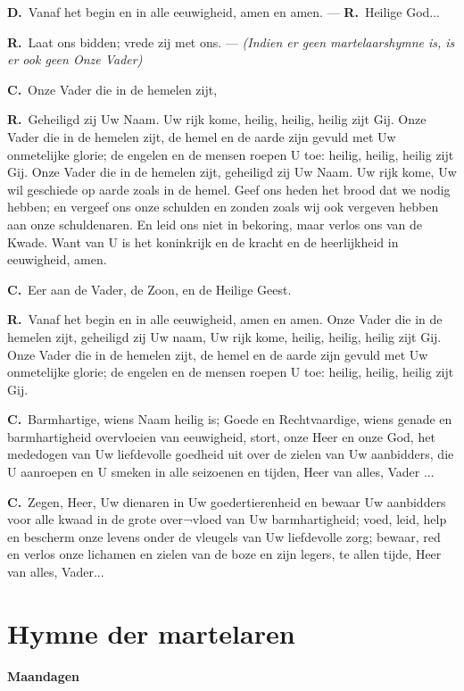 \documentclass[12pt,twoside,a5paper]{article}
\newcommand{\cc}{{\color{BrickRed} \textbf{C.}}}
\newcommand{\dd}{{\color{BrickRed} \textbf{D.}}}
\newcommand{\rr}{{\color{BrickRed} \textbf{R.}}}
\newcommand{\liturgicalhint}[1]{{\color{BrickRed}\footnotesize\itshape{#1}}}
\newcommand{\liturgicaloption}[1]{{\color{BrickRed}\textbf{#1}}}
\newcommand{\markedsection}[1]{\section*{#1}\markboth{#1}{}}
\newcommand{\markedday}[1]{%
  \liturgicaloption{#1}%
  \markright{#1}%
}
\begin{document}
\dd\ Vanaf het begin en in alle eeuwigheid, amen en amen. ---  \rr\ Heilige God...

\rr\ Laat ons bidden; vrede zij met ons. --- \liturgicalhint{(Indien er geen martelaarshymne is, is er ook geen Onze Vader)}

\cc\ Onze Vader die in de hemelen zijt,

\rr\ Geheiligd zij Uw Naam. Uw rijk kome, heilig, heilig, heilig zijt Gij. Onze Vader die in de hemelen zijt, de hemel en de aarde zijn gevuld met Uw onmetelijke glorie; de engelen en de mensen roepen U toe: heilig, heilig, heilig zijt Gij. Onze Vader die in de hemelen zijt, geheiligd zij Uw Naam. Uw rijk kome, Uw wil geschiede op aarde zoals in de hemel. Geef ons heden het brood dat we nodig hebben; en vergeef ons onze schulden en zonden zoals wij ook vergeven hebben aan onze schuldenaren. En leid ons niet in bekoring, maar verlos ons van de Kwade. Want van U is het koninkrijk en de kracht en de heerlijkheid in eeuwigheid, amen.

\cc\ Eer aan de Vader, de Zoon, en de Heilige Geest.

\rr\ Vanaf het begin en in alle eeuwigheid, amen en amen. Onze Vader die in de hemelen zijt, geheiligd zij Uw naam, Uw rijk kome, heilig, heilig, heilig zijt Gij. Onze Vader die in de hemelen zijt, de hemel en de aarde zijn gevuld met Uw onmetelijke glorie; de engelen en de mensen roepen U toe: heilig, heilig, heilig zijt Gij.

\cc\ Barmhartige, wiens Naam heilig is; Goede en Rechtvaardige, wiens genade en barmhartigheid overvloeien van eeuwigheid, stort, onze Heer en onze God, het mededogen van Uw liefdevolle goedheid uit over de zielen van Uw aanbidders, die U aanroepen en U smeken in alle seizoenen en tijden, Heer van alles, Vader ...

\cc\ Zegen, Heer, Uw dienaren in Uw goedertierenheid en bewaar Uw aanbidders voor alle kwaad in de grote over¬vloed van Uw barmhartigheid; voed, leid, help en bescherm onze levens onder de vleugels van Uw liefdevolle zorg; bewaar, red en verlos onze lichamen en zielen van de boze en zijn legers, te allen tijde, Heer van alles, Vader...


\markedsection{Hymne der martelaren}

\markedday{Maandagen}
\end{document}
